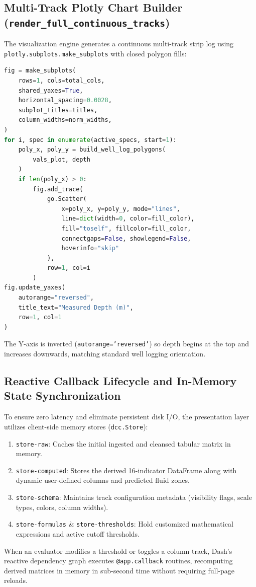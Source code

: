 \subsection{Multi-Track Plotly Chart Builder (\texttt{render\_full\_continuous\_tracks})}
The visualization engine generates a continuous multi-track strip log using \texttt{plotly.subplots.make\_subplots} with closed polygon fills:
\begin{lstlisting}[language=Python, caption={Plotly multi-track chart generation in \texttt{app.py}}]
fig = make_subplots(
    rows=1, cols=total_cols,
    shared_yaxes=True,
    horizontal_spacing=0.0028,
    subplot_titles=titles,
    column_widths=norm_widths,
)
for i, spec in enumerate(active_specs, start=1):
    poly_x, poly_y = build_well_log_polygons(
        vals_plot, depth
    )
    if len(poly_x) > 0:
        fig.add_trace(
            go.Scatter(
                x=poly_x, y=poly_y, mode="lines",
                line=dict(width=0, color=fill_color),
                fill="toself", fillcolor=fill_color,
                connectgaps=False, showlegend=False,
                hoverinfo="skip"
            ),
            row=1, col=i
        )
fig.update_yaxes(
    autorange="reversed", 
    title_text="Measured Depth (m)", 
    row=1, col=1
)
\end{lstlisting}
The Y-axis is inverted (\texttt{autorange='reversed'}) so depth begins at the top and increases downwards, matching standard well logging orientation.

\subsection{Reactive Callback Lifecycle and In-Memory State Synchronization}
To ensure zero latency and eliminate persistent disk I/O, the presentation layer utilizes client-side memory stores (\texttt{dcc.Store}):
\begin{enumerate}
    \item \texttt{store-raw}: Caches the initial ingested and cleansed tabular matrix in memory.
    \item \texttt{store-computed}: Stores the derived 16-indicator DataFrame along with dynamic user-defined columns and predicted fluid zones.
    \item \texttt{store-schema}: Maintains track configuration metadata (visibility flags, scale types, colors, column widths).
    \item \texttt{store-formulas} \& \texttt{store-thresholds}: Hold customized mathematical expressions and active cutoff thresholds.
\end{enumerate}
When an evaluator modifies a threshold or toggles a column track, Dash's reactive dependency graph executes \texttt{@app.callback} routines, recomputing derived matrices in memory in sub-second time without requiring full-page reloads.

